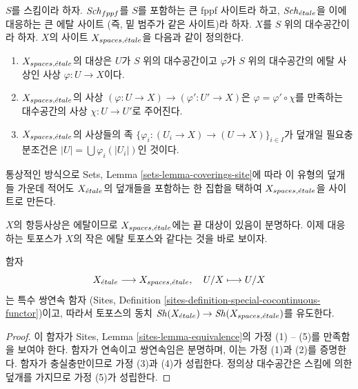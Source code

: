 \begin{definition}
\label{definition-spaces-etale-site}
$S$를 스킴이라 하자.
$\mathit{Sch}_{fppf}$를 $S$를 포함하는 큰 fppf 사이트라 하고,
$\mathit{Sch}_{\acute{e}tale}$을 이에 대응하는 큰 에탈 사이트
(즉, 밑 범주가 같은 사이트)라 하자.
$X$를 $S$ 위의 대수공간이라 하자.
$X$의 사이트 {\it $X_{spaces, {\acute{e}tale}}$}을 다음과 같이 정의한다.
\begin{enumerate}
\item $X_{spaces, {\acute{e}tale}}$의 대상은 $U$가 $S$ 위의 대수공간이고
$\varphi$가 $S$ 위의 대수공간의 에탈 사상인 사상
$\varphi : U \to X$이다.
\item $X_{spaces, {\acute{e}tale}}$의 사상
$(\varphi : U \to X) \to (\varphi' : U' \to X)$은
$\varphi = \varphi' \circ \chi$를 만족하는 대수공간의 사상
$\chi : U \to U'$로 주어진다.
\item $X_{spaces, {\acute{e}tale}}$의 사상들의 족
$\{\varphi_i : (U_i \to X) \to (U \to X)\}_{i \in I}$가
덮개일 필요충분조건은
$|U| = \bigcup \varphi_i(|U_i|)$인 것이다.
\end{enumerate}
통상적인 방식으로 Sets, Lemma \ref{sets-lemma-coverings-site}에 따라
이 유형의 덮개들 가운데 적어도 $X_{\acute{e}tale}$의 덮개들을 포함하는
한 집합을 택하여 $X_{spaces, {\acute{e}tale}}$을 사이트로 만든다.
\end{definition}

\noindent
$X$의 항등사상은 에탈이므로 $X_{spaces, {\acute{e}tale}}$에는 끝 대상이
있음이 분명하다. 이제 대응하는 토포스가 $X$의 작은 에탈 토포스와
같다는 것을 바로 보이자.

\begin{lemma}
\label{lemma-compare-etale-sites}
함자
$$
X_{\acute{e}tale} \longrightarrow X_{spaces, {\acute{e}tale}}, \quad
U/X \longmapsto U/X
$$
는 특수 쌍연속 함자
(Sites, Definition \ref{sites-definition-special-cocontinuous-functor})이고,
따라서 토포스의 동치
$\mathop{\mathit{Sh}}\nolimits(X_{\acute{e}tale}) \to \mathop{\mathit{Sh}}\nolimits(X_{spaces, {\acute{e}tale}})$를 유도한다.
\end{lemma}

\begin{proof}
이 함자가 Sites, Lemma \ref{sites-lemma-equivalence}의 가정
(1) -- (5)를 만족함을 보여야 한다.
함자가 연속이고 쌍연속임은 분명하며, 이는 가정 (1)과 (2)를 증명한다.
함자가 충실충만이므로 가정 (3)과 (4)가 성립한다.
정의상 대수공간은 스킴에 의한 덮개를 가지므로 가정 (5)가 성립한다.
\end{proof}

